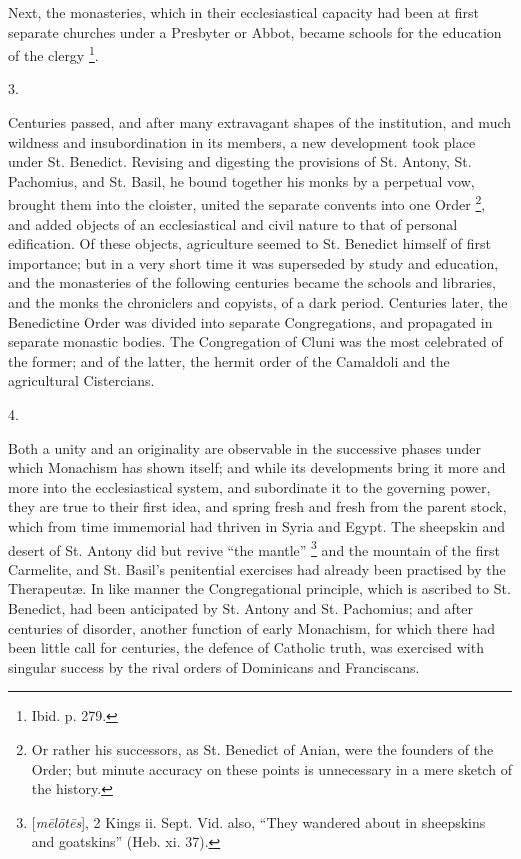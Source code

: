 Next, the monasteries, which in their ecclesiastical capacity had
been at first separate churches under a Presbyter or Abbot, became
schools for the education of the clergy \footnote{Ibid. p. 279.}.

3.

Centuries passed, and after many extravagant shapes of the
institution, and much wildness and insubordination in its members, a
new development took place under St. Benedict. Revising and digesting
the provisions of St. Antony, St. Pachomius, and St. Basil, he bound
together his monks by a perpetual vow, brought them into the cloister,
united the separate convents into one Order \footnote{Or rather his successors, as St. Benedict
of Anian, were the founders of the Order; but minute accuracy on these
points is unnecessary in a mere sketch of the history.}, and added
objects of an ecclesiastical and civil nature to that of personal
edification. Of these objects, agriculture seemed to St. Benedict
himself of first importance; but in a very short time it was
superseded by study and education, and the monasteries of the
following centuries became the schools and libraries, and the monks
the chroniclers and copyists, of a dark period. Centuries later, the
Benedictine Order was divided into separate Congregations, and
propagated in separate monastic bodies. The Congregation of Cluni was
the most celebrated of the former; and of the latter, the hermit order
of the Camaldoli and the agricultural Cistercians.

4.

Both a unity and an originality are observable in the successive
phases under which Monachism has shown itself; and while its
developments bring it more and more into the ecclesiastical system,
and subordinate it to the governing power, they are true to their
first idea, and spring fresh and fresh from the parent stock, which
from time immemorial had thriven in Syria and Egypt. The sheepskin and
desert of St. Antony did but revive ``the mantle'' \footnote{[\emph{m\={e}l\={o}t\={e}s}],
2 Kings ii. Sept. Vid. also, ``They wandered about in sheepskins
and goatskins'' (Heb. xi. 37).}
and the mountain of the first Carmelite, and St. Basil's penitential
exercises had already been practised by the Therapeutæ. In like
manner the Congregational principle, which is ascribed to St.
Benedict, had been anticipated by St. Antony and St. Pachomius; and
after centuries of disorder, another function of early Monachism, for
which there had been little call for centuries, the defence of
Catholic truth, was exercised with singular success by the rival
orders of Dominicans and Franciscans.

